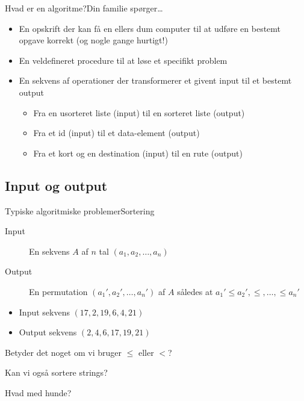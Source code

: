 \documentclass{beamer}
\begin{document}
\begin{frame}{Hvad er en algoritme?}{Din familie spørger\ldots}
    \pause
    \begin{itemize}
        \item En \alert{opskrift} der kan få en ellers dum computer til at
            udføre en bestemt opgave korrekt (og nogle gange hurtigt!) \pause
        \item En \alert{veldefineret procedure} til at løse et specifikt problem
            \pause
        \item En sekvens af \alert{operationer} der transformerer et givent
            \alert{input} til et bestemt \alert{output}
            \begin{itemize}
                \item Fra en usorteret liste (input) til en sorteret liste
                    (output)
                \item Fra et id (input) til et data-element (output)
                \item Fra et kort og en destination (input) til en rute (output)
            \end{itemize}
    \end{itemize}
\end{frame}

\subsection{Input og output}

\begin{frame}{Typiske algoritmiske problemer}{Sortering}
    \begin{description}
        \item[Input] En sekvens $A$ af $n$ tal $(a_1, a_2, \ldots, a_n)$
            \pause
        \item[Output] En permutation $(a_1', a_2', \ldots, a_n')$ af $A$ således
            at $a_1' \leq a_2', \leq, \ldots, \leq a_n'$ \pause
    \end{description}

    \begin{example}
        \begin{itemize}
            \item Input sekvens $(17, 2, 19, 6, 4, 21)$ \\
            \item Output sekvens $(2, 4, 6, 17, 19, 21)$
        \end{itemize}
    \end{example}

    \pause
    Betyder det noget om vi bruger $\leq$ eller $<$?

    \pause
    Kan vi også sortere strings?

    \pause
    Hvad med hunde?

\end{frame}
\end{document}
